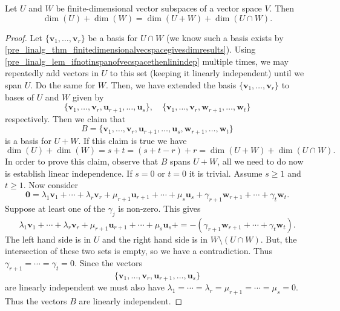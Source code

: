 \documentclass[10pt, a4paper]{article}
\newcommand{\mbf}[1]{\mathbf{#1}}
\begin{document}
\begin{proposition}\label{pre_linalg_prop_sumofdimsissumofsumandintersection}
    Let $U$ and $W$ be finite-dimensional vector subspaces of a vector space $V$.
    Then
    \[
    \dim(U) + \dim(W) = \dim(U + W) + \dim(U \cap W).
    \]
    \begin{proof}
        Let $\{\mbf{v}_1, \dotsc, \mbf{v}_r\}$ be a basis for $U \cap W$
        (we know such a basis exists by \autoref{pre_linalg_thm_finitedimensionalvecspacegivesdimresults}).
        Using \autoref{pre_linalg_lem_ifnotinspanofvecspacethenlinindep} multiple times,
        we may repeatedly add vectors in $U$ to this set
        (keeping it linearly independent)
        until we span $U$.
        Do the same for $W$.
        Then,
        we have extended the basis $\{\mbf{v}_1, \dotsc, \mbf{v}_r\}$ to bases of $U$ and $W$ given by
        \[
        \{\mbf{v}_1, \dotsc, \mbf{v}_r, \mbf{u}_{r + 1}, \dotsc, \mbf{u}_s\},\quad\{\mbf{v}_1, \dotsc, \mbf{v}_r, \mbf{w}_{r + 1}, \dotsc, \mbf{w}_t\}
        \]
        respectively.
        Then we claim that
        \[
        B = \{\mbf{v}_1, \dotsc, \mbf{v}_r, \mbf{u}_{r + 1}, \dotsc, \mbf{u}_s, \mbf{w}_{r + 1}, \dotsc, \mbf{w}_t\}
        \]
        is a basis for $U + W$.
        If this claim is true we have
        \[
        \dim(U) + \dim(W) = s + t = (s + t - r) + r = \dim(U + W) + \dim(U \cap W).
        \]
        In order to prove this claim,
        observe that $B$ spans $U + W$,
        all we need to do now is establish linear independence.
        If $s = 0$ or $t = 0$ it is trivial.
        Assume $s \geq 1$ and $t \geq 1$.
        Now consider
        \[
        \mbf{0} = \lambda_1\mbf{v}_1 + \dotsi + \lambda_r\mbf{v}_r + \mu_{r + 1}\mbf{u}_{r + 1} + \dotsi + \mu_s\mbf{u}_s + \gamma_{r + 1}\mbf{w}_{r + 1} + \dotsi + \gamma_t\mbf{w}_t.
        \]
        Suppose at least one of the $\gamma_j$ is non-zero.
        This gives
        \[
        \lambda_1\mbf{v}_1 + \dotsi + \lambda_r\mbf{v}_r + \mu_{r + 1}\mbf{u}_{r + 1} + \dotsi + \mu_s\mbf{u}_s + = -(\gamma_{r + 1}\mbf{w}_{r + 1} + \dotsi + \gamma_t\mbf{w}_t).
        \]
        The left hand side is in $U$ and the right hand side is in $W \setminus (U \cap W)$.
        But,
        the intersection of these two sets is empty,
        so we have a contradiction.
        Thus $\gamma_{r + 1} = \dotsi = \gamma_t = 0$.
        Since the vectors
        \[
        \{\mbf{v}_1, \dotsc, \mbf{v}_r, \mbf{u}_{r + 1}, \dotsc, \mbf{u}_s\}
        \]
        are linearly independent we must also have $\lambda_1 = \dotsi = \lambda_r = \mu_{r + 1} = \dotsi = \mu_s = 0$.
        Thus the vectors $B$ are linearly independent.
    \end{proof}
\end{proposition}
\end{document}
